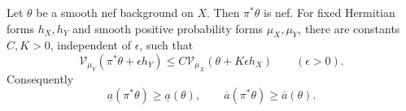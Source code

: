 \begin{proposition}\label{prop:nef-modification-volume}
Let $\theta$ be a smooth nef background on $X$. Then $\pi^*\theta$ is nef. For fixed Hermitian forms $h_X,h_Y$ and smooth positive probability forms $\mu_X,\mu_Y$, there are constants $C,K>0$, independent of $\epsilon$, such that
\begin{equation}\label{eq:nef-main-modification-comparison}
 \mathcal V_{\mu_Y}(\pi^*\theta+\epsilon h_Y)
 \leq C\mathcal V_{\mu_X}(\theta+K\epsilon h_X)
 \qquad(\epsilon>0).
\end{equation}
Consequently
\[
 \underline a(\pi^*\theta)\geq\underline a(\theta),\qquad
 \overline a(\pi^*\theta)\geq\overline a(\theta).
\]
\end{proposition}

